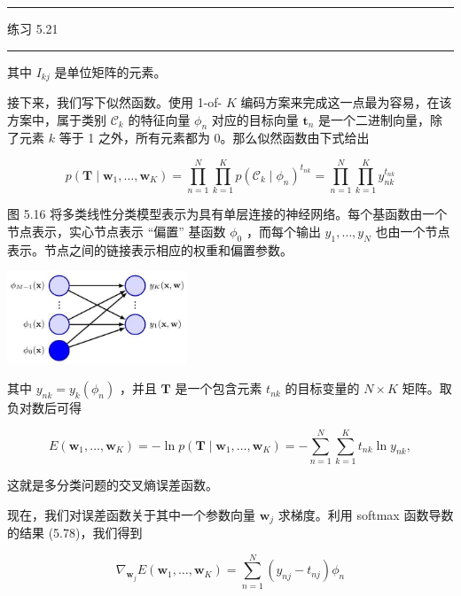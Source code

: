 \documentclass[10pt]{report}
\newcommand{\HRule}{\begin{center}\rule{0.9\linewidth}{0.2mm}\end{center}}
\begin{document}
\HRule

练习 5.21

\HRule

其中 \({I}_{kj}\) 是单位矩阵的元素。

接下来，我们写下似然函数。使用 1-of- \(K\) 编码方案来完成这一点最为容易，在该方案中，属于类别 \({\mathcal{C}}_{k}\) 的特征向量 \({\phi }_{n}\) 对应的目标向量 \({\mathbf{t}}_{n}\) 是一个二进制向量，除了元素 \(k\) 等于 1 之外，所有元素都为 0。那么似然函数由下式给出

\[
p\left( {\mathbf{T} \mid  {\mathbf{w}}_{1},\ldots ,{\mathbf{w}}_{K}}\right)  = \mathop{\prod }\limits_{{n = 1}}^{N}\mathop{\prod }\limits_{{k = 1}}^{K}p{\left( {\mathcal{C}}_{k} \mid  {\phi }_{n}\right) }^{{t}_{nk}} = \mathop{\prod }\limits_{{n = 1}}^{N}\mathop{\prod }\limits_{{k = 1}}^{K}{y}_{nk}^{{t}_{nk}} \tag{5.79}
\]

图 5.16 将多类线性分类模型表示为具有单层连接的神经网络。每个基函数由一个节点表示，实心节点表示 “偏置” 基函数 \({\phi }_{0}\) ，而每个输出 \({y}_{1},\ldots ,{y}_{N}\) 也由一个节点表示。节点之间的链接表示相应的权重和偏置参数。

\begin{center}
\includegraphics[max width=0.4\textwidth]{images/0194e279-9b28-703a-88f4-c3ac21e2010d_181_975_344_567_294_0.jpg}
\end{center}
\hspace*{3em} 

其中 \({y}_{nk} = {y}_{k}\left( {\phi }_{n}\right)\) ，并且 \(\mathbf{T}\) 是一个包含元素 \({t}_{nk}\) 的目标变量的 \(N \times  K\) 矩阵。取负对数后可得

\[
E\left( {{\mathbf{w}}_{1},\ldots ,{\mathbf{w}}_{K}}\right)  =  - \ln p\left( {\mathbf{T} \mid  {\mathbf{w}}_{1},\ldots ,{\mathbf{w}}_{K}}\right)  =  - \mathop{\sum }\limits_{{n = 1}}^{N}\mathop{\sum }\limits_{{k = 1}}^{K}{t}_{nk}\ln {y}_{nk}, \tag{5.80}
\]

这就是多分类问题的交叉熵误差函数。

现在，我们对误差函数关于其中一个参数向量 \({\mathbf{w}}_{j}\) 求梯度。利用 softmax 函数导数的结果 (5.78)，我们得到

\[
{\nabla }_{{\mathbf{w}}_{j}}E\left( {{\mathbf{w}}_{1},\ldots ,{\mathbf{w}}_{K}}\right)  = \mathop{\sum }\limits_{{n = 1}}^{N}\left( {{y}_{nj} - {t}_{nj}}\right) {\phi }_{n} \tag{5.81}
\]
\end{document}
